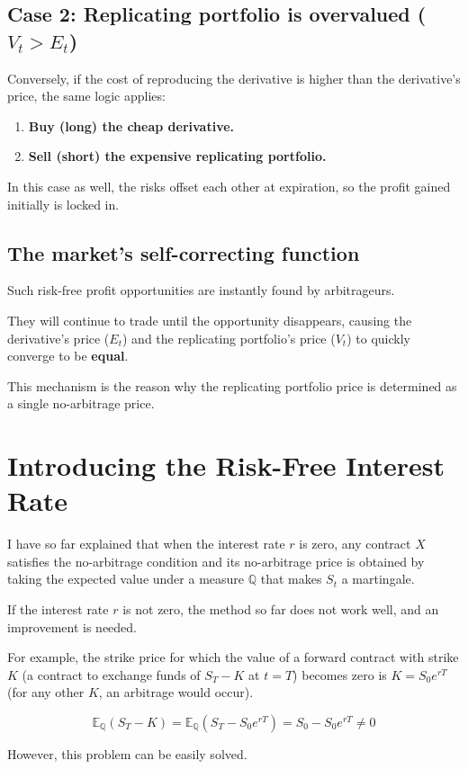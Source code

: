 \documentclass[uplatex,a4j,12pt,dvipdfmx]{jsarticle}
\begin{document}
\subsection{Case 2: Replicating portfolio is overvalued ($V_t > E_t$)}
Conversely, if the cost of reproducing the derivative is higher than the derivative's price, the same logic applies:
\begin{enumerate}
	\item \textbf{Buy (long) the cheap derivative.}
	\item \textbf{Sell (short) the expensive replicating portfolio.}
\end{enumerate}
In this case as well, the risks offset each other at expiration, so the profit gained initially is locked in.

\subsection{The market's self-correcting function}
Such risk-free profit opportunities are instantly found by arbitrageurs.

They will continue to trade until the opportunity disappears, causing the derivative's price ($E_t$) and the replicating portfolio's price ($V_t$) to quickly converge to be \textbf{equal}.

This mechanism is the reason why the replicating portfolio price is determined as a single no-arbitrage price.

\section{Introducing the Risk-Free Interest Rate}
I have so far explained that when the interest rate $r$ is zero, any contract $X$ satisfies the no-arbitrage condition and its no-arbitrage price is obtained by taking the expected value under a measure $\mathbb{Q}$ that makes $S_{t}$ a martingale.

If the interest rate $r$ is not zero, the method so far does not work well, and an improvement is needed.

For example, the strike price for which the value of a forward contract with strike $K$ (a contract to exchange funds of $S_{T}-K$ at $t=T$) becomes zero is $K=S_{0} e^{rT}$ (for any other $K$, an arbitrage would occur).

$$ \mathbb{E}_{\mathbb{Q}}(S_{T} - K) = \mathbb{E}_{\mathbb{Q}}(S_{T} - S_{0} e^{rT}) = S_{0} - S_{0} e^{rT} \neq 0 $$

However, this problem can be easily solved.
\end{document}
